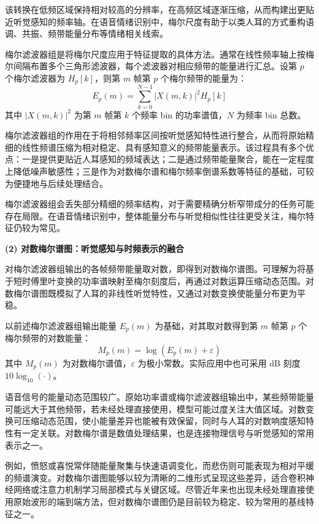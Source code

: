 该转换在低频区域保持相对较高的分辨率，在高频区域逐渐压缩，从而构建出更贴近听觉感知的频率轴。在语音情绪识别中，梅尔尺度有助于以类人耳的方式重构语调、共振、频带能量分布等情绪相关线索\cite{pappagari2023music,peng2021efficient}。

梅尔滤波器组是将梅尔尺度应用于特征提取的具体方法。通常在线性频率轴上按梅尔间隔布置多个三角形滤波器，每个滤波器对相应频带的能量进行汇总。设第 $p$ 个梅尔滤波器为 $H_p[k]$，则第 $m$ 帧第 $p$ 个梅尔频带的能量为：
\begin{equation}
E_p(m) = \sum_{k=0}^{N-1} |X(m,k)|^2 H_p[k]
\end{equation}
其中 $|X(m,k)|^2$ 为第 $m$ 帧第 $k$ 个频率 bin 的功率谱值，$N$ 为频率 bin 总数。

梅尔滤波器组的作用在于将相邻频率区间按听觉感知特性进行整合，从而将原始精细的线性频谱压缩为相对稳定、具有感知意义的频带能量表示\cite{peng2021efficient,chen2023dwformer}。该过程具有多个优点：一是提供更贴近人耳感知的频域表达；二是通过频带能量聚合，能在一定程度上降低噪声敏感性；三是作为对数梅尔谱和梅尔频率倒谱系数等特征的基础，可较为便捷地与后续处理结合。

梅尔滤波器组会丢失部分精细的频率结构，对于需要精确分析窄带成分的任务可能存在局限。在语音情绪识别中，整体能量分布与听觉相似性往往更受关注，梅尔特征仍较为常见\cite{hao2024channel,pappagari2023music,peng2021efficient}。


\textbf{(2) 对数梅尔谱图：听觉感知与时频表示的融合}

对梅尔滤波器组输出的各帧频带能量取对数，即得到对数梅尔谱图。可理解为将基于短时傅里叶变换的功率谱映射至梅尔刻度后，再通过对数运算压缩动态范围。对数梅尔谱图既模拟了人耳的非线性听觉特性，又通过对数变换使能量分布更为平稳。

以前述梅尔滤波器组输出能量 $E_p(m)$ 为基础，对其取对数得到第 $m$ 帧第 $p$ 个梅尔频带的对数能量：
\begin{equation}
M_p(m) = \log\left(E_p(m)+\varepsilon\right)
\end{equation}
其中 $M_p(m)$ 为对数梅尔谱值，$\varepsilon$ 为极小常数。实际应用中也可采用 dB 刻度 $10\log_{10}(\cdot)$。

语音信号的能量动态范围较广。原始功率谱或梅尔滤波器组输出中，某些频带能量可能远大于其他频带，若未经处理直接使用，模型可能过度关注大值区域。对数变换可压缩动态范围，使小能量差异也能被有效保留，同时与人耳的对数响度感知特性有一定关联。对数梅尔谱是数值处理结果，也是连接物理信号与听觉感知的常用表示之一\cite{he2023multiple,peng2021efficient,wang2024swin}。

例如，愤怒或喜悦常伴随能量聚集与快速语调变化，而悲伤则可能表现为相对平缓的频谱演变。对数梅尔谱图能够以较为清晰的二维形式呈现这些差异，适合卷积神经网络或注意力机制学习局部模式与关键区域\cite{peng2021efficient,zhang2023cnn,wang2024swin}。尽管近年来也出现未经处理直接使用原始波形的端到端方法，但对数梅尔谱图仍是目前较为稳定、较为常用的基线特征之一\cite{pappagari2023music}。

